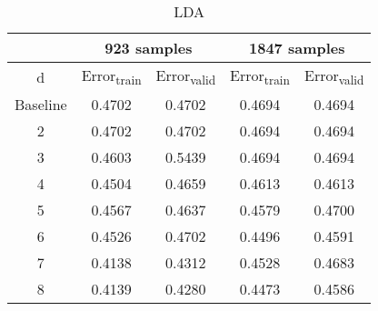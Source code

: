 \documentclass[conference,letterpaper]{IEEEtran}
\begin{document}
\begin{table}[h]
\renewcommand{\arraystretch}{1.2}
\renewcommand{\thefootnote}{\alph{footnote}}
\caption{LDA} \label{table3}
\begin{minipage} {0.5\textwidth}
\begin{center}
    \begin{tabular}{ | c | c | c | c | c |}
    \hline
\multirow{2}{0.1in}{} 
& \multicolumn{2}{|c|}{923 samples} & \multicolumn{2}{|c|}{1847 samples} \\
\cline{2-4}
    \hline
    d & Error\textsubscript{train} & Error\textsubscript{valid} & Error\textsubscript{train} & Error\textsubscript{valid} \\ \hline
    Baseline & 0.4702 & 0.4702 & 0.4694 & 0.4694 \\ \hline
    2 & 0.4702 & 0.4702 & 0.4694 & 0.4694 \\ \hline
    3 & 0.4603 & 0.5439 & 0.4694 & 0.4694 \\ \hline
    4 & 0.4504 & 0.4659 & 0.4613 & 0.4613 \\ \hline
    5 & 0.4567 & 0.4637 & 0.4579 & 0.4700 \\ \hline
    6 & 0.4526 & 0.4702 & 0.4496 & 0.4591 \\ \hline
    7 & 0.4138 & 0.4312 & 0.4528 & 0.4683 \\ \hline
    8 & 0.4139 & 0.4280 & 0.4473 & 0.4586 \\ \hline
    \end{tabular}
\end{center}
\end{minipage}
\end{table}
\end{document}
